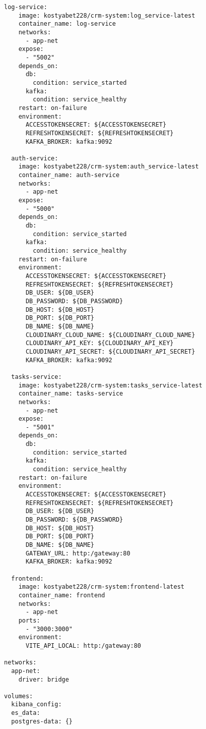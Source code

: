 \begin{lstlisting}[style=CodeListing]
  log-service:
    image: kostyabet228/crm-system:log_service-latest
    container_name: log-service
    networks:
      - app-net
    expose:
      - "5002"
    depends_on:
      db:
        condition: service_started
      kafka:
        condition: service_healthy
    restart: on-failure
    environment:
      ACCESSTOKENSECRET: ${ACCESSTOKENSECRET}
      REFRESHTOKENSECRET: ${REFRESHTOKENSECRET}
      KAFKA_BROKER: kafka:9092

  auth-service:
    image: kostyabet228/crm-system:auth_service-latest
    container_name: auth-service
    networks:
      - app-net
    expose:
      - "5000"
    depends_on:
      db:
        condition: service_started
      kafka:
        condition: service_healthy
    restart: on-failure
    environment:
      ACCESSTOKENSECRET: ${ACCESSTOKENSECRET}
      REFRESHTOKENSECRET: ${REFRESHTOKENSECRET}
      DB_USER: ${DB_USER}
      DB_PASSWORD: ${DB_PASSWORD}
      DB_HOST: ${DB_HOST}
      DB_PORT: ${DB_PORT}
      DB_NAME: ${DB_NAME}
      CLOUDINARY_CLOUD_NAME: ${CLOUDINARY_CLOUD_NAME}
      CLOUDINARY_API_KEY: ${CLOUDINARY_API_KEY}
      CLOUDINARY_API_SECRET: ${CLOUDINARY_API_SECRET}
      KAFKA_BROKER: kafka:9092

  tasks-service:
    image: kostyabet228/crm-system:tasks_service-latest
    container_name: tasks-service
    networks:
      - app-net
    expose:
      - "5001"
    depends_on:
      db:
        condition: service_started
      kafka:
        condition: service_healthy
    restart: on-failure
    environment:
      ACCESSTOKENSECRET: ${ACCESSTOKENSECRET}
      REFRESHTOKENSECRET: ${REFRESHTOKENSECRET}
      DB_USER: ${DB_USER}
      DB_PASSWORD: ${DB_PASSWORD}
      DB_HOST: ${DB_HOST}
      DB_PORT: ${DB_PORT}
      DB_NAME: ${DB_NAME}
      GATEWAY_URL: http:/gateway:80
      KAFKA_BROKER: kafka:9092

  frontend:
    image: kostyabet228/crm-system:frontend-latest
    container_name: frontend
    networks:
      - app-net
    ports:
      - "3000:3000"
    environment:
      VITE_API_LOCAL: http:/gateway:80

networks:
  app-net:
    driver: bridge

volumes:
  kibana_config:
  es_data:
  postgres-data: {}

\end{lstlisting}

